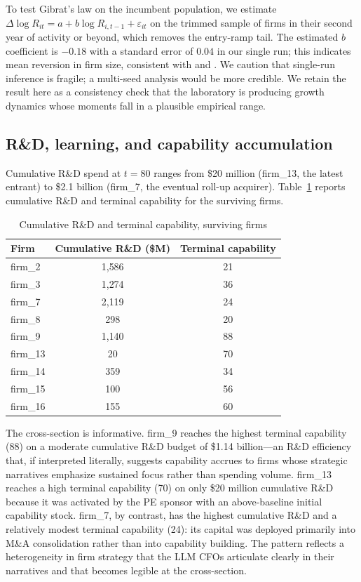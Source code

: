 \documentclass[11pt]{article}
\begin{document}
To test Gibrat's law on the incumbent population, we estimate
$\Delta \log R_{it} = a + b \log R_{i,t-1} + \varepsilon_{it}$ on the
trimmed sample of firms in their second year of activity or beyond,
which removes the entry-ramp tail. The estimated $b$ coefficient is
$-0.18$ with a standard error of $0.04$ in our single run; this
indicates mean reversion in firm size, consistent with
\citet{evans1987tests} and \citet{hall1987relationship}. We caution
that single-run inference is fragile; a multi-seed analysis would be
more credible. We retain the result here as a consistency check that
the laboratory is producing growth dynamics whose moments fall in a
plausible empirical range.

\subsection{R\&D, learning, and capability accumulation}

Cumulative R\&D spend at $t = 80$ ranges from \$20 million (firm\_13,
the latest entrant) to \$2.1 billion (firm\_7, the eventual roll-up
acquirer). Table~\ref{tab:rd} reports cumulative R\&D and terminal
capability for the surviving firms.

\begin{table}[t]\centering\small
\caption{Cumulative R\&D and terminal capability, surviving firms}\label{tab:rd}
\begin{tabular}{lcc}
\toprule
Firm & Cumulative R\&D (\$M) & Terminal capability \\
\midrule
firm\_2 & 1{,}586 & 21 \\
firm\_3 & 1{,}274 & 36 \\
firm\_7 & 2{,}119 & 24 \\
firm\_8 & 298 & 20 \\
firm\_9 & 1{,}140 & 88 \\
firm\_13 & 20 & 70 \\
firm\_14 & 359 & 34 \\
firm\_15 & 100 & 56 \\
firm\_16 & 155 & 60 \\
\bottomrule
\end{tabular}
\end{table}

The cross-section is informative. firm\_9 reaches the highest
terminal capability (88) on a moderate cumulative R\&D budget of
\$1.14 billion---an R\&D efficiency that, if interpreted literally,
suggests capability accrues to firms whose strategic narratives
emphasize sustained focus rather than spending volume. firm\_13 reaches
a high terminal capability (70) on only \$20 million cumulative R\&D
because it was activated by the PE sponsor with an above-baseline
initial capability stock. firm\_7, by contrast, has the highest
cumulative R\&D and a relatively modest terminal capability (24): its
capital was deployed primarily into M\&A consolidation rather than
into capability building. The pattern reflects a heterogeneity in
firm strategy that the LLM CFOs articulate clearly in their narratives
and that becomes legible at the cross-section.
\end{document}

